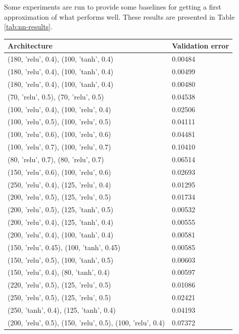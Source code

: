 Some experiments are run to provide some baselines for getting a first approximation of what performs well. These results are presented in Table \ref{tab:nn-results}.

\begin{table}[h!]
    \centering
    \begin{tabular}{|p{}|p{}|}
        \hline
        Architecture & Validation error \\ \hline
        (180, 'relu', 0.4), (100, 'tanh', 0.4) & 0.00484 \\
        (180, 'relu', 0.4), (100, 'tanh', 0.4) & 0.00499 \\
        (180, 'relu', 0.4), (100, 'tanh', 0.4) & 0.00480 \\
        (70, 'relu', 0.5), (70, 'relu', 0.5) & 0.04538 \\
        (100, 'relu', 0.4), (100, 'relu', 0.4) & 0.02506 \\
        (100, 'relu', 0.5), (100, 'relu', 0.5) & 0.04111 \\
        (100, 'relu', 0.6), (100, 'relu', 0.6) & 0.04481 \\
        (100, 'relu', 0.7), (100, 'relu', 0.7) & 0.10410 \\
        (80, 'relu', 0.7), (80, 'relu', 0.7) & 0.06514 \\
        (150, 'relu', 0.6), (100, 'relu', 0.6) & 0.02693 \\
        (250, 'relu', 0.4), (125, 'relu', 0.4) & 0.01295 \\
        (200, 'relu', 0.5), (125, 'relu', 0.5) & 0.01734 \\
        (200, 'relu', 0.5), (125, 'tanh', 0.5) & 0.00532 \\
        (200, 'relu', 0.4), (125, 'tanh', 0.4) & 0.00555 \\
        (200, 'relu', 0.4), (100, 'tanh', 0.4) & 0.00581 \\
        (150, 'relu', 0.45), (100, 'tanh', 0.45) & 0.00585 \\
        (150, 'relu', 0.5), (100, 'tanh', 0.5) & 0.00603 \\
        (150, 'relu', 0.4), (80, 'tanh', 0.4) & 0.00597 \\
        (220, 'relu', 0.5), (125, 'relu', 0.5) & 0.01086 \\
        (250, 'relu', 0.5), (125, 'relu', 0.5) & 0.02421 \\
        (250, 'tanh', 0.4), (125, 'tanh', 0.4) & 0.04193 \\
        (200, 'relu', 0.5), (150, 'relu', 0.5), (100, 'relu', 0.4) & 0.07372 \\

\end{tabular}
\end{table}
